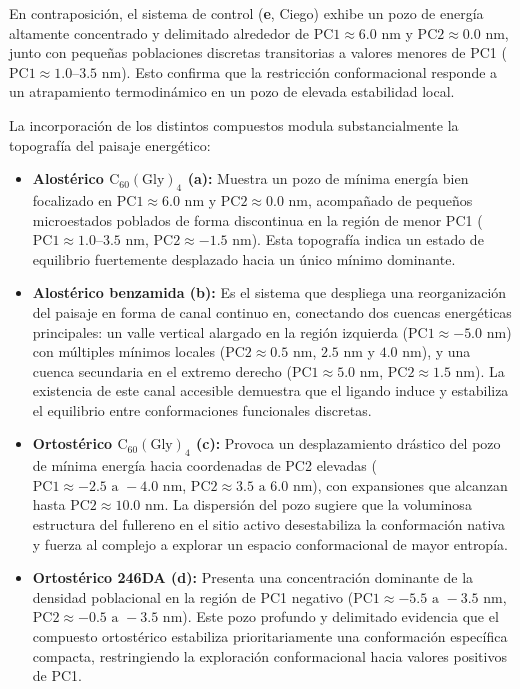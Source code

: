 En contraposición, el sistema de control (\textbf{e}, Ciego) exhibe un pozo de energía altamente concentrado y delimitado alrededor de $\text{PC1} \approx 6.0\text{ nm}$ y $\text{PC2} \approx 0.0\text{ nm}$, junto con pequeñas poblaciones discretas transitorias a valores menores de PC1 ($\text{PC1} \approx 1.0\text{--}3.5\text{ nm}$). Esto confirma que la restricción conformacional responde a un atrapamiento termodinámico en un pozo de elevada estabilidad local.

La incorporación de los distintos compuestos modula substancialmente la topografía del paisaje energético:

\begin{itemize}
    \item \textbf{Alostérico $\text{C}_{60}(\text{Gly})_4$ (a):} Muestra un pozo de mínima energía bien focalizado en $\text{PC1} \approx 6.0\text{ nm}$ y $\text{PC2} \approx 0.0\text{ nm}$, acompañado de pequeños microestados poblados de forma discontinua en la región de menor PC1 ($\text{PC1} \approx 1.0\text{--}3.5\text{ nm}$, $\text{PC2} \approx -1.5\text{ nm}$). Esta topografía indica un estado de equilibrio fuertemente desplazado hacia un único mínimo dominante.
    
    \item \textbf{Alostérico benzamida (b):} Es el sistema que despliega una reorganización del paisaje en forma de canal continuo en, conectando dos cuencas energéticas principales: un valle vertical alargado en la región izquierda ($\text{PC1} \approx -5.0\text{ nm}$) con múltiples mínimos locales ($\text{PC2} \approx 0.5\text{ nm}$, $2.5\text{ nm}$ y $4.0\text{ nm}$), y una cuenca secundaria en el extremo derecho ($\text{PC1} \approx 5.0\text{ nm}$, $\text{PC2} \approx 1.5\text{ nm}$). La existencia de este canal accesible demuestra que el ligando induce y estabiliza el equilibrio entre conformaciones funcionales discretas.
    
    \item \textbf{Ortostérico $\text{C}_{60}(\text{Gly})_4$ (c):} Provoca un desplazamiento drástico del pozo de mínima energía hacia coordenadas de PC2 elevadas ($\text{PC1} \approx -2.5\text{ a }-4.0\text{ nm}$, $\text{PC2} \approx 3.5\text{ a }6.0\text{ nm}$), con expansiones que alcanzan hasta $\text{PC2} \approx 10.0\text{ nm}$. La dispersión del pozo sugiere que la voluminosa estructura del fullereno en el sitio activo desestabiliza la conformación nativa y fuerza al complejo a explorar un espacio conformacional de mayor entropía.
    
    \item \textbf{Ortostérico 246DA (d):} Presenta una concentración dominante de la densidad poblacional en la región de PC1 negativo ($\text{PC1} \approx -5.5\text{ a }-3.5\text{ nm}$, $\text{PC2} \approx -0.5\text{ a }-3.5\text{ nm}$). Este pozo profundo y delimitado evidencia que el compuesto ortostérico estabiliza prioritariamente una conformación específica compacta, restringiendo la exploración conformacional hacia valores positivos de PC1.
\end{itemize}




